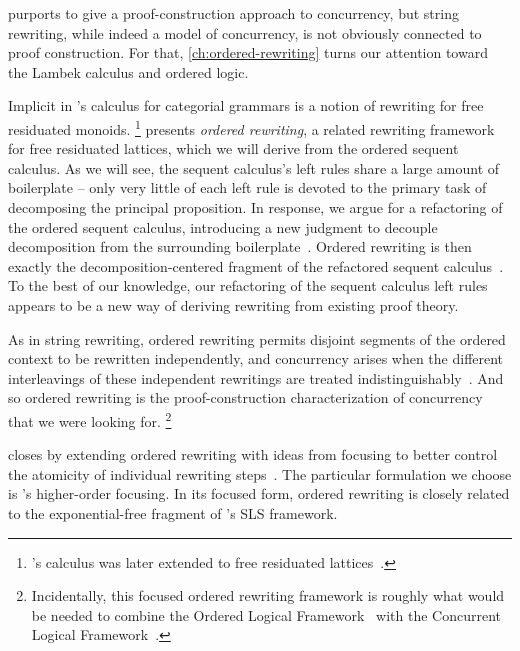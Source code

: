  purports to give a proof-construction approach to concurrency, but string rewriting, while indeed a model of concurrency, is not obviously connected to proof construction.
For that, \cref{ch:ordered-rewriting} turns our attention toward the Lambek calculus and ordered logic.

Implicit in \citeauthor{Lambek:AMM58}'s calculus for categorial grammars is a notion of rewriting for free residuated monoids.%
\footnote{'s calculus was later extended to free residuated lattices~\parencites{Lambek:SLIM61}{Kanazawa:LLI92}.}
 presents \emph{ordered rewriting}, a related rewriting framework for free residuated lattices, which we will derive from the ordered sequent calculus.
As we will see, the sequent calculus's left rules share a large amount of boilerplate -- only very little of each left rule is devoted to the primary task of decomposing the principal proposition.
In response, we argue for a refactoring of the ordered sequent calculus, introducing a new judgment to decouple decomposition from the surrounding boilerplate~.
Ordered rewriting is then exactly
the decomposition-centered fragment of the refactored sequent calculus~.
To the best of our knowledge, our refactoring of the sequent calculus left rules appears to be a new way of deriving rewriting from existing proof theory.

As in string rewriting, ordered rewriting permits disjoint segments of the ordered context to be rewritten independently, and concurrency arises when the different interleavings of these independent rewritings are treated indistinguishably~.
And so ordered rewriting is the proof-construction characterization of concurrency that we were looking for.%
\footnote{Incidentally, this focused ordered rewriting framework is roughly what would be needed to combine the Ordered Logical Framework~\parencite{Polakow:CMU01} with the Concurrent Logical Framework~\parencite{Watkins+:CMU02}.}

 closes by extending ordered rewriting with ideas from focusing\autocites{Andreoli:JLC92} to better control the atomicity of individual rewriting steps~.
The particular formulation we choose is \citeauthor{Zeilberger:POPL08}'s higher-order focusing\autocite{Zeilberger:POPL08}.
In its focused form, ordered rewriting is closely related to the exponential-free fragment of \citeauthor{Simmons:CMU12}'s SLS framework.\autocite{Simmons:CMU12}

